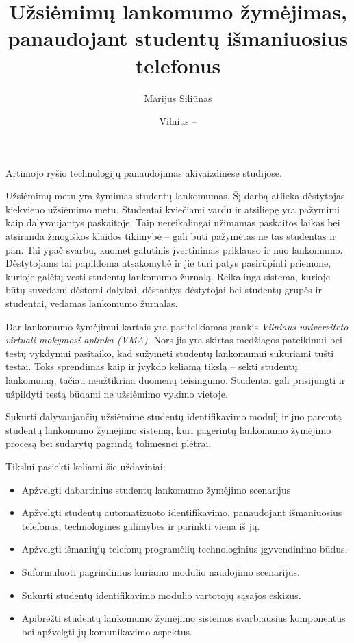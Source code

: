 \documentclass{VUMIFPSkursinis}
\title{Užsiėmimų lankomumo žymėjimas, panaudojant studentų išmaniuosius telefonus}
\author{Marijus Siliūnas}
\date{Vilnius – \the\year}
\begin{document}
\maketitle



\tableofcontents



Artimojo ryšio technologijų panaudojimas akivaizdinėse studijose.


Užsiėmimų metu yra žymimas studentų lankomumas. Šį darbą atlieka dėstytojas kiekvieno užsiėmimo metu. Studentai kviečiami vardu ir atsiliepę yra pažymimi kaip dalyvaujantys paskaitoje. Taip nereikalingai užimamas paskaitos laikas bei atsiranda žmogiškos klaidos tikimybė – gali būti pažymėtas ne tas studentas ir pan. Tai ypač svarbu, kuomet galutinis įvertinimas priklauso ir nuo lankomumo. Dėstytojams tai papildoma atsakomybė ir jie turi patys pasirūpinti priemone, kurioje galėtų vesti studentų lankomumo žurnalą. Reikalinga sistema, kurioje būtų suvedami dėstomi dalykai, dėstantys dėstytojai bei studentų grupės ir studentai, vedamas lankomumo žurnalas.

Dar lankomumo žymėjimui kartais yra pasitelkiamas įrankis \textit{Vilniaus universiteto virtuali mokymosi aplinka (VMA)}. Nors jis yra skirtas medžiagos pateikimui bei testų vykdymui pasitaiko, kad sužymėti studentų lankomumui sukuriami tušti testai. Toks sprendimas kaip ir įvykdo keliamą tikslą – sekti studentų lankomumą, tačiau neužtikrina duomenų teisingumo. Studentai gali prisijungti ir užpildyti testą būdami ne užsiėmimo vykimo vietoje.


Sukurti dalyvaujančių užsiėmime studentų identifikavimo modulį ir juo paremtą studentų lankomumo žymėjimo sistemą, kuri pagerintų lankomumo žymėjimo procesą bei sudarytų pagrindą tolimesnei plėtrai.


Tikslui pasiekti keliami šie uždaviniai:

\begin{itemize}
    \item Apžvelgti dabartinius studentų lankomumo žymėjimo scenarijus
	\item Apžvelgti studentų automatizuoto identifikavimo, panaudojant išmaniuosius telefonus, technologines galimybes ir parinkti viena iš jų.
	\item Apžvelgti išmaniųjų telefonų programėlių technologinius įgyvendinimo būdus.
	\item Suformuluoti pagrindinius kuriamo modulio naudojimo scenarijus.
	\item Sukurti studentų identifikavimo modulio vartotojų sąsajos eskizus.
	\item Apibrėžti studentų lankomumo žymėjimo sistemos svarbiausius komponentus bei apžvelgti jų komunikavimo aspektus.
\end{itemize}
\end{document}
